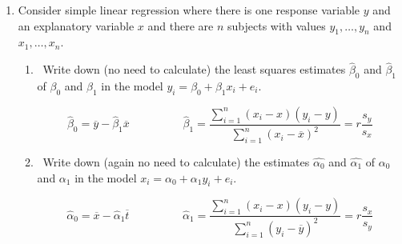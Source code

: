 \documentclass[12pt]{article}
\begin{document}
\begin{enumerate}[leftmargin=0cm,itemindent=.5cm,labelwidth=\itemindent,labelsep=0cm,align=left]
\begin{proof}
\noindent The resulting system of equations requires that $$\sum\limits_{i=1}^{252} a_i x_{i1} = 1 \hspace{1.5cm} \sum\limits_{i=1}^{252} a_ix_{i2} = 0 \hspace{1.5cm} \sum\limits_{i=1}^{252} a_ix_{i1} + 10\sum\limits_{i=1}^{252} a_i x_{i2} = 0$$ all be solved simultaneously by some $a_1, \dots, a_{252}$.  However, substituting the second equation into the third gives $\sum\limits_{i=1}^{252} a_i x_{i1} = 0$, which contradicts the first.

\noindent (b) We can edit the formula to leave out the last term I(AGE + 10*WEIGHT).  The estimates for the coefficients given for (INTERCEPT), AGE, WEIGHT, and HEIGHT are $\beta_0$, $(\beta_1 + \beta_4)$, $(\beta_2 + 10\beta_4)$, and $\beta_3$, respectively:



\noindent (c) If we keep the last term in the formula, R actually gives these same coefficients for each of these variables, meaning that it is actually estimating $\beta_0$, $(\beta_1 + \beta_4)$, $(\beta_2 + 10\beta_4)$, and $\beta_3$ for both formulas:


\end{proof}

\item Consider simple linear regression where there is one response variable $y$ and an explanatory variable $x$ and there are $n$ subjects with values $y_1, \dots , y_n$ and $x_1, \dots , x_n$.
\begin{enumerate}
\item \ Write down (no need to calculate) the least squares estimates $\hat{\beta}_0$ and $\hat{\beta}_1$ of $\beta_0$ and $\beta_1$ in the model $y_i = \beta_0 + \beta_1 x_i + e_i$.

$$ \hat{\beta}_0 = \overline{y} - \hat{\beta}_1\overline{x} \hspace{2cm} \hat{\beta}_1 = \frac{\sum\limits_{i=1}^n (x_i - x)(y_i - y) }{\sum\limits_{i=1}^n (x_i - \overline{x})^2} = r \frac{s_y}{s_x} $$

\item \ Write down (again no need to calculate) the estimates $\hat{\alpha_0}$ and $\hat{\alpha_1}$ of $\alpha_0$ and $\alpha_1$ in the model $x_i = \alpha_0 + \alpha_1 y_i + e_i$.

$$ \hat{\alpha}_0 = \overline{x} - \hat{\alpha}_1\overline{t} \hspace{2cm} \hat{\alpha}_1 = \frac{\sum\limits_{i=1}^n (x_i - x)(y_i - y) }{\sum\limits_{i=1}^n (y_i - \overline{y})^2} = r \frac{s_x}{s_y} $$


\end{enumerate}
\end{enumerate}
\end{document}
